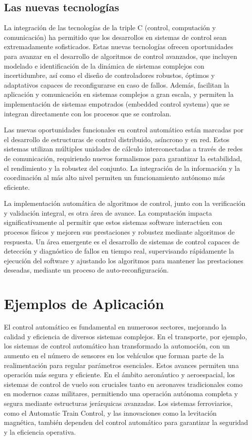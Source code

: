 \documentclass[journal, table]{IEEEtran}
\begin{document}
\subsection{Las nuevas tecnologías}%
\label{sub:Las nuevas tecnologías}

La integración de las tecnologías de la triple C (control, computación y
comunicación) ha permitido que los desarrollos en sistemas de control sean
extremadamente sofisticados.
Estas nuevas tecnologías ofrecen oportunidades para avanzar en el desarrollo de
algoritmos de control avanzados, que incluyen modelado e identificación de la
dinámica de sistemas complejos con incertidumbre, así como el diseño de
controladores robustos, óptimos y adaptativos capaces de reconfigurarse en caso
de fallos.
Además, facilitan la aplicación y comunicación en sistemas complejos a gran
escala, y permiten la implementación de sistemas empotrados (embedded control
systems) que se integran directamente con los procesos que se controlan.

Las nuevas oportunidades funcionales en control automático están marcadas por
el desarrollo de estructuras de control distribuido, asíncrono y en red.
Estos sistemas utilizan múltiples unidades de cálculo interconectadas a través
de redes de comunicación, requiriendo nuevos formalismos para garantizar la
estabilidad, el rendimiento y la robustez del conjunto.
La integración de la información y la coordinación al más alto nivel permiten
un funcionamiento autónomo más eficiente.

La implementación automática de algoritmos de control, junto con la verificación
y validación integral, es otra área de avance.
La computación impacta significativamente al permitir que estos sistemas
software interactúen con procesos físicos y mejoren sus prestaciones y robustez
mediante algoritmos de respuesta.
Un área emergente es el desarrollo de sistemas de control capaces de detección y
diagnóstico de fallos en tiempo real, supervisando rápidamente la ejecución del
software y ajustando los algoritmos para mantener las prestaciones deseadas,
mediante un proceso de auto-reconfiguración.

\section{Ejemplos de Aplicación}%
\label{sec:Ejemplos de Aplicación}

El control automático es fundamental en numerosos sectores, mejorando la calidad
y eficiencia de diversos sistemas complejos. En el transporte, por ejemplo,
los sistemas de control automático han transformado la automoción, con un aumento
en el número de sensores en los vehículos que forman parte de la realimentación
para regular parámetros esenciales.
Estos avances permiten una operación más segura y eficiente.
En el ámbito aeronáutico y aeroespacial, los sistemas de control de vuelo son
cruciales tanto en aeronaves tradicionales como en modernos cazas militares,
permitiendo una operación autónoma completa y segura mediante estructuras
jerárquicas avanzadas.
Los sistemas ferroviarios, como el Automatic Train Control, y las innovaciones
como la levitación magnética, también dependen del control automático para
garantizar la seguridad y la eficiencia operativa.
\end{document}
